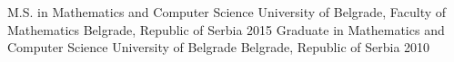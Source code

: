 


\begin{cventries}


\cventry
{M.S. in Mathematics and Computer Science} %
{University of Belgrade, Faculty of Mathematics} %
{Belgrade, Republic of Serbia} %
{2015} %
{ %
}
\cventry
{Graduate in Mathematics and Computer Science}
{University of Belgrade}
{Belgrade, Republic of Serbia}
{2010}
{ %
}
\

\end{cventries}
